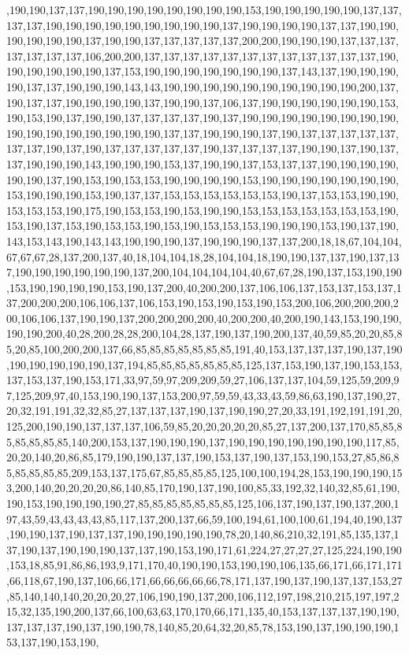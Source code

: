 ,190,190,137,137,190,190,190,190,190,190,190,190,153,190,190,190,190,190,137,137,137,137,190,190,190,190,190,190,190,190,190,137,190,190,190,190,137,137,190,190,190,190,190,190,137,190,190,137,137,137,137,137,200,200,190,190,190,137,137,137,137,137,137,137,106,200,200,137,137,137,137,137,137,137,137,137,137,137,137,190,190,190,190,190,190,137,153,190,190,190,190,190,190,190,137,143,137,190,190,190,190,137,137,190,190,190,143,143,190,190,190,190,190,190,190,190,190,190,200,137,190,137,137,190,190,190,190,137,190,190,137,106,137,190,190,190,190,190,190,153,190,153,190,137,190,190,137,137,137,137,190,137,190,190,190,190,190,190,190,190,190,190,190,190,190,190,190,190,137,137,190,190,190,137,190,137,137,137,137,137,137,137,190,137,190,137,137,137,137,137,190,137,137,137,137,190,190,137,190,137,137,190,190,190,143,190,190,190,153,137,190,190,137,153,137,137,190,190,190,190,190,190,137,190,153,190,153,153,190,190,190,190,153,190,190,190,190,190,190,190,153,190,190,190,153,190,137,137,153,153,153,153,153,153,190,137,153,153,190,190,153,153,153,190,175,190,153,153,190,153,190,190,153,153,153,153,153,153,153,190,153,190,137,153,190,153,153,190,153,190,153,153,153,190,190,190,153,190,137,190,143,153,143,190,143,143,190,190,190,137,190,190,190,137,137,200,18,18,67,104,104,67,67,67,28,137,200,137,40,18,104,104,18,28,104,104,18,190,190,137,137,190,137,137,190,190,190,190,190,190,137,200,104,104,104,104,40,67,67,28,190,137,153,190,190,153,190,190,190,190,153,190,137,200,40,200,200,137,106,106,137,153,137,153,137,137,200,200,200,106,106,137,106,153,190,153,190,153,190,153,200,106,200,200,200,200,106,106,137,190,190,137,200,200,200,200,40,200,200,40,200,190,143,153,190,190,190,190,200,40,28,200,28,28,200,104,28,137,190,137,190,200,137,40,59,85,20,20,85,85,20,85,100,200,200,137,66,85,85,85,85,85,85,85,191,40,153,137,137,137,190,137,190,190,190,190,190,190,137,194,85,85,85,85,85,85,85,125,137,153,190,137,190,153,153,137,153,137,190,153,171,33,97,59,97,209,209,59,27,106,137,137,104,59,125,59,209,97,125,209,97,40,153,190,190,137,153,200,97,59,59,43,33,43,59,86,63,190,137,190,27,20,32,191,191,32,32,85,27,137,137,137,190,137,190,190,27,20,33,191,192,191,191,20,125,200,190,190,137,137,137,106,59,85,20,20,20,20,20,85,27,137,200,137,170,85,85,85,85,85,85,85,140,200,153,137,190,190,190,137,190,190,190,190,190,190,190,117,85,20,20,140,20,86,85,179,190,190,137,137,190,153,137,190,137,153,190,153,27,85,86,85,85,85,85,85,209,153,137,175,67,85,85,85,85,125,100,100,194,28,153,190,190,190,153,200,140,20,20,20,20,86,140,85,170,190,137,190,100,85,33,192,32,140,32,85,61,190,190,153,190,190,190,190,27,85,85,85,85,85,85,85,125,106,137,190,137,190,137,200,197,43,59,43,43,43,43,85,117,137,200,137,66,59,100,194,61,100,100,61,194,40,190,137,190,190,137,190,137,137,190,190,190,190,190,78,20,140,86,210,32,191,85,135,137,137,190,137,190,190,190,137,137,190,153,190,171,61,224,27,27,27,27,125,224,190,190,153,18,85,91,86,86,193,9,171,170,40,190,190,153,190,190,106,135,66,171,66,171,171,66,118,67,190,137,106,66,171,66,66,66,66,66,78,171,137,190,137,190,137,137,153,27,85,140,140,140,20,20,20,27,106,190,190,137,200,106,112,197,198,210,215,197,197,215,32,135,190,200,137,66,100,63,63,170,170,66,171,135,40,153,137,137,137,190,190,137,137,137,190,137,190,190,78,140,85,20,64,32,20,85,78,153,190,137,190,190,190,153,137,190,153,190,